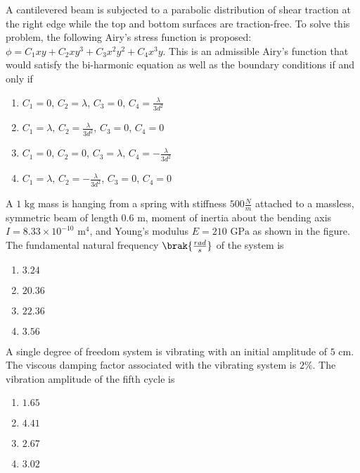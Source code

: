     \item A cantilevered beam is subjected to a parabolic distribution of shear traction at the right edge while the top and bottom surfaces are traction-free. To solve this problem, the following Airy's stress function is proposed: $\phi = C_1 xy + C_2 xy^3 + C_3 x^2 y^2 + C_4 x^3 y$. This is an admissible Airy's function that would satisfy the bi-harmonic equation as well as the boundary conditions if and only if




    \begin{enumerate}
        \item $C_1 = 0$, $C_2 = \lambda$, $C_3 = 0$, $C_4 = \frac{\lambda}{3d^2}$
        \item $C_1 =\lambda$, $C_2 = \frac{\lambda}{3d^2}$, $C_3 = 0$, $C_4 = 0$
        \item $C_1 = 0$, $C_2 = 0$, $C_3 = \lambda$, $C_4 = -\frac{\lambda}{3d^2}$
        \item $C_1 = \lambda$, $C_2 = -\frac{\lambda}{3d^2}$, $C_3 = 0$, $C_4 = 0$
    \end{enumerate}

    \item A $1 \text{ kg}$ mass is hanging from a spring with stiffness $500 \frac{N}{m}$ attached to a massless, symmetric beam of length $0.6 \text{ m}$, moment of inertia about the bending axis $I = 8.33 \times 10^{-10} \text{ m}^4$, and Young's modulus $E = 210 \text{ GPa}$ as shown in the figure. The fundamental natural frequency $\brak{\frac{rad}{s}}$ of the system is
    


	    \begin{enumerate}
        \item $3.24$
        \item $20.36$
        \item $22.36$
        \item $3.56$
    \end{enumerate}

    \item A single degree of freedom system is vibrating with an initial  amplitude of $5 \text{ cm}$. The viscous damping factor associated with the vibrating system is $2\%$. The vibration amplitude of the fifth cycle  is
    \begin{enumerate}
        \item $1.65$
        \item $4.41$
        \item $2.67$
        \item $3.02$
    \end{enumerate}

